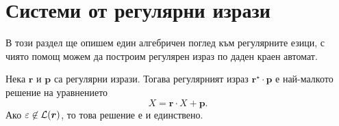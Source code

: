 \section{Системи от регулярни изрази}

В този раздел ще опишем един алгебричен поглед към регулярните езици, с чиято помощ можем да построим регулярен израз по даден краен автомат.

\begin{important}
  \begin{lemma}
    \label{lem:regular:system:arden}
    Нека $\bm{r}$  и $\bm{p}$ са регулярни изрази.
    Тогава регулярният израз $\bm{r}^\star \cdot \bm{p}$ е най-малкото решение на уравнението
    \begin{equation}
      \label{eq:system:arden}
      X = \bm{r} \cdot X + \bm{p}.
    \end{equation}
    Ако $\varepsilon  \not \in \mathcal{L}(\bm{r})$, то това решение е и единствено.
  \end{lemma}
\end{important}
